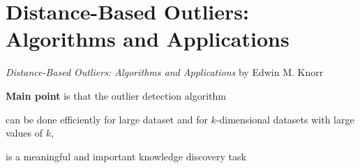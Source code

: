 \section{Distance-Based Outliers: Algorithms and Applications}
\label{ch:knorr00}

\textit{Distance-Based Outliers: Algorithms and Applications} by Edwin M. Knorr
\newline

\textbf{Main point} is that the outlier detection algorithm \begin{inparaenum}
\item can be done efficiently for large dataset and for $k$-dimensional datasets with large values of $k$, 
\item is a meaningful and important knowledge discovery task
\end{inparaenum}

